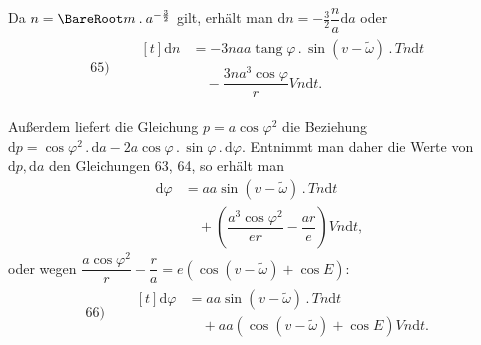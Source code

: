 Da \(n=\BareRoot m\mathbin{.}a^{-\frac32}\) gilt, erhält man \(\mathrm{d}n=-\tfrac32\dfrac{n}{a}\mathrm{d}a\) oder
\[
\begin{array}{rl}
65)\quad&\begin{aligned}[t]\mathrm{d}n&=-3naa\operatorname{tang}\varphi\mathbin{.}\sin(v-\tilde\omega)\mathbin{.}Tn\mathrm{d}t\\&\quad-\dfrac{3na^3\cos\varphi}{r}Vn\mathrm{d}t.\end{aligned}
\end{array}
\]
\par Außerdem liefert die Gleichung \(p=a\cos\varphi^2\) die Beziehung \(\mathrm{d}p=\cos\varphi^2\mathbin{.}\mathrm{d}a-2a\cos\varphi\mathbin{.}\sin\varphi\mathbin{.}\mathrm{d}\varphi\). Entnimmt man daher die Werte von \(\mathrm{d}p,\mathrm{d}a\) den Gleichungen 63, 64, so erhält man
\[
\begin{aligned}
\mathrm{d}\varphi&=aa\sin(v-\tilde\omega)\mathbin{.}Tn\mathrm{d}t\\
&\quad+\left(\dfrac{a^3\cos\varphi^2}{er}-\dfrac{ar}{e}\right)Vn\mathrm{d}t,
\end{aligned}
\]
oder wegen \(\dfrac{a\cos\varphi^2}{r}-\dfrac{r}{a}=e(\cos(v-\tilde\omega)+\cos E)\):
\[
\begin{array}{rl}
66)\quad&\begin{aligned}[t]\mathrm{d}\varphi&=aa\sin(v-\tilde\omega)\mathbin{.}Tn\mathrm{d}t\\&\quad+aa(\cos(v-\tilde\omega)+\cos E)Vn\mathrm{d}t.\end{aligned}
\end{array}
\]
